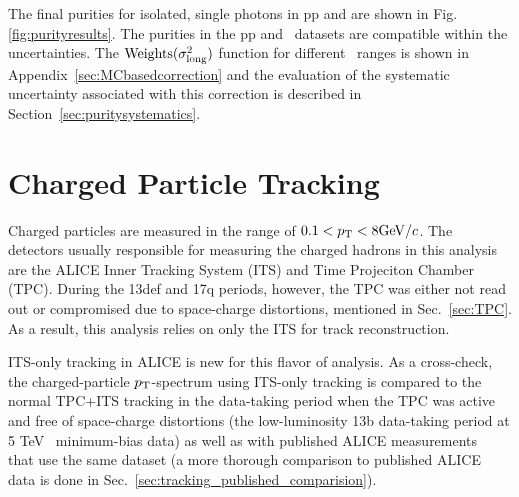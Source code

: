 The final purities for isolated, single photons in pp and \pPb are shown in Fig. \ref{fig:purityresults}. The purities in the pp and \pPb~datasets are compatible within the uncertainties. The $\text{Weights}(\sigma^{2}_{\mathrm{long}})$ function for different \pt~ranges is shown in Appendix~\ref{sec:MCbasedcorrection} and the evaluation of the systematic uncertainty associated with this correction is described in Section~\ref{sec:puritysystematics}. 
\FloatBarrier



\section{Charged Particle Tracking}
\label{sec:tracking}
Charged particles are measured in the range of $0.1 < p_{\mathrm{T}} < 8 \mathrm{GeV}/c$. The detectors usually responsible for measuring the charged hadrons in this analysis are the ALICE Inner Tracking System (ITS) and Time Projeciton Chamber (TPC). During the 13def and 17q periods, however, the TPC was either not read out or compromised due to space-charge distortions, mentioned in Sec.~\ref{sec:TPC}. As a result, this analysis relies on only the ITS for track reconstruction.

ITS-only tracking in ALICE is new for this flavor of analysis. As a cross-check, the charged-particle $p_{\mathrm{T}}$-spectrum using ITS-only tracking is compared to the normal TPC+ITS tracking in the data-taking period when the TPC was active and free of space-charge distortions (the low-luminosity 13b data-taking period at 5 TeV \pPb~minimum-bias data) as well as with published ALICE measurements~\cite{Acharya:2018qsh} that use the same dataset (a more thorough comparison to published ALICE data is done in Sec.~\ref{sec:tracking_published_comparision}).

